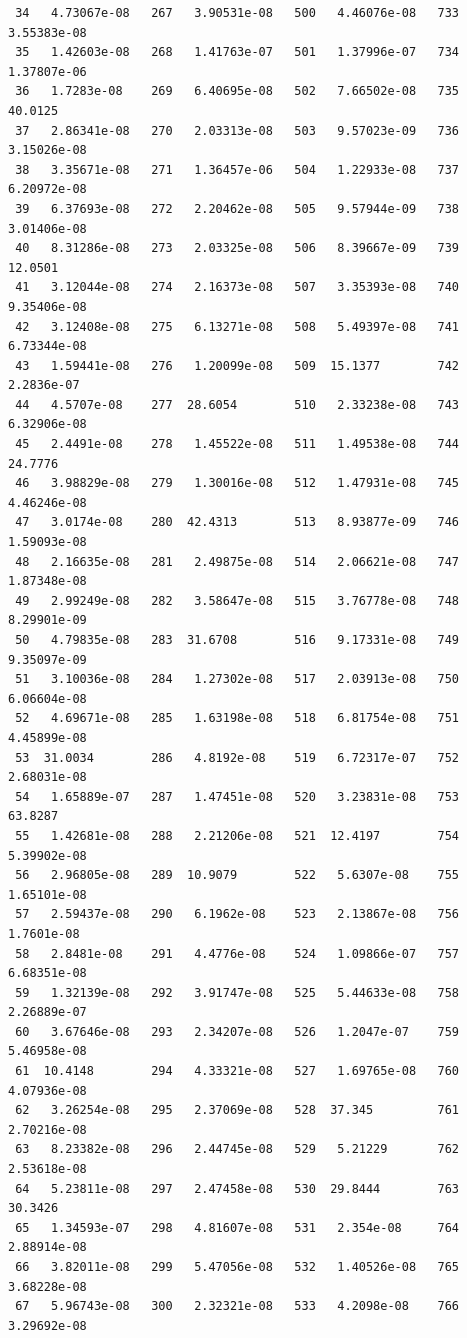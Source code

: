 \documentclass{article}
\begin{document}
\begin{verbatim}
 34   4.73067e-08   267   3.90531e-08   500   4.46076e-08   733   3.55383e-08
 35   1.42603e-08   268   1.41763e-07   501   1.37996e-07   734   1.37807e-06
 36   1.7283e-08    269   6.40695e-08   502   7.66502e-08   735  40.0125
 37   2.86341e-08   270   2.03313e-08   503   9.57023e-09   736   3.15026e-08
 38   3.35671e-08   271   1.36457e-06   504   1.22933e-08   737   6.20972e-08
 39   6.37693e-08   272   2.20462e-08   505   9.57944e-09   738   3.01406e-08
 40   8.31286e-08   273   2.03325e-08   506   8.39667e-09   739  12.0501
 41   3.12044e-08   274   2.16373e-08   507   3.35393e-08   740   9.35406e-08
 42   3.12408e-08   275   6.13271e-08   508   5.49397e-08   741   6.73344e-08
 43   1.59441e-08   276   1.20099e-08   509  15.1377        742   2.2836e-07
 44   4.5707e-08    277  28.6054        510   2.33238e-08   743   6.32906e-08
 45   2.4491e-08    278   1.45522e-08   511   1.49538e-08   744  24.7776
 46   3.98829e-08   279   1.30016e-08   512   1.47931e-08   745   4.46246e-08
 47   3.0174e-08    280  42.4313        513   8.93877e-09   746   1.59093e-08
 48   2.16635e-08   281   2.49875e-08   514   2.06621e-08   747   1.87348e-08
 49   2.99249e-08   282   3.58647e-08   515   3.76778e-08   748   8.29901e-09
 50   4.79835e-08   283  31.6708        516   9.17331e-08   749   9.35097e-09
 51   3.10036e-08   284   1.27302e-08   517   2.03913e-08   750   6.06604e-08
 52   4.69671e-08   285   1.63198e-08   518   6.81754e-08   751   4.45899e-08
 53  31.0034        286   4.8192e-08    519   6.72317e-07   752   2.68031e-08
 54   1.65889e-07   287   1.47451e-08   520   3.23831e-08   753  63.8287
 55   1.42681e-08   288   2.21206e-08   521  12.4197        754   5.39902e-08
 56   2.96805e-08   289  10.9079        522   5.6307e-08    755   1.65101e-08
 57   2.59437e-08   290   6.1962e-08    523   2.13867e-08   756   1.7601e-08
 58   2.8481e-08    291   4.4776e-08    524   1.09866e-07   757   6.68351e-08
 59   1.32139e-08   292   3.91747e-08   525   5.44633e-08   758   2.26889e-07
 60   3.67646e-08   293   2.34207e-08   526   1.2047e-07    759   5.46958e-08
 61  10.4148        294   4.33321e-08   527   1.69765e-08   760   4.07936e-08
 62   3.26254e-08   295   2.37069e-08   528  37.345         761   2.70216e-08
 63   8.23382e-08   296   2.44745e-08   529   5.21229       762   2.53618e-08
 64   5.23811e-08   297   2.47458e-08   530  29.8444        763  30.3426
 65   1.34593e-07   298   4.81607e-08   531   2.354e-08     764   2.88914e-08
 66   3.82011e-08   299   5.47056e-08   532   1.40526e-08   765   3.68228e-08
 67   5.96743e-08   300   2.32321e-08   533   4.2098e-08    766   3.29692e-08

\end{verbatim}
\end{document}

